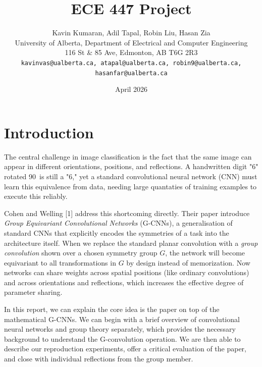 \documentclass{article}
\title{ECE 447 Project}
\author{
  Kavin Kumaran, Adil Tapal, Robin Liu, Hasan Zia \\
  University of Alberta, Department of Electrical and Computer Engineering \\
  116 St \& 85 Ave, Edmonton, AB T6G 2R3 \\
  \texttt{kavinvas@ualberta.ca, atapal@ualberta.ca, robin9@ualberta.ca, hasanfar@ualberta.ca}
}
\date{April 2026}
\begin{document}
\maketitle

\section{Introduction}
    The central challenge in image classification is the fact that the same image can appear in different orientations, positions, and reflections. A handwritten digit "6" rotated 90\degree\ is still a "6," yet a standard convolutional neural network (CNN) must learn this equivalence from data, needing large quantaties of training examples to execute this reliably.
    
    Cohen and Welling [1] address this shortcoming directly. Their paper introduce \emph{Group Equivariant Convolutional Networks} (G-CNNs), a generalisation of standard CNNs that explicitly encodes the symmetries of a task into the architecture itself. When we replace the standard planar convolution with a \emph{group convolution} shown over a chosen symmetry group $G$, the network will become equivariant to all transformations in $G$ by design instead of memorization. Now networks can share weights across spatial positions (like ordinary convolutions) and across orientations and reflections, which increases the effective degree of parameter sharing.

    In this report, we can explain the core idea is the paper on top of the mathematical G-CNNs. We can begin with a brief overview of convolutional neural networks and group theory separately, which provides the necessary background to understand the G-convolution operation. We are then able to describe our reproduction experiments, offer a critical evaluation of the paper, and close with individual reflections from the group member.
\end{document}
